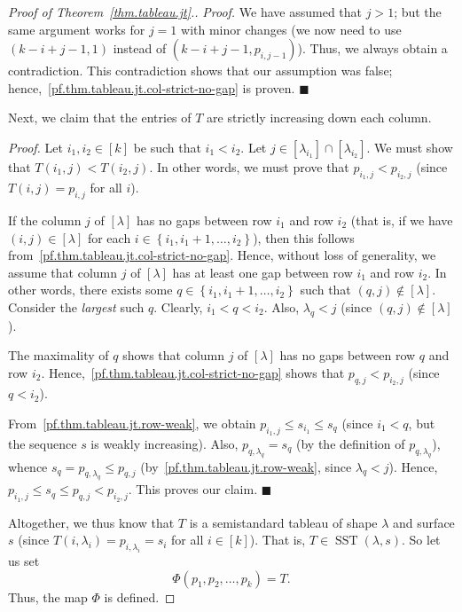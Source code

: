 \documentclass[reqno]{amsart}
\newcommand{\0}{\phantom{c}}
\newcommand{\diag}[1]{\left[#1\right]} %
\DeclareMathOperator{\SST}{SST} %
\newenvironment{subproof}{\textit{Proof.} }{\hfill$\blacksquare$ \medskip}
\newenvironment{verlong}{}{}
\newcommand{\set}[1]{\left\{ #1 \right\}}
\newcommand{\tup}[1]{\left( #1 \right)}
\newcommand{\ive}[1]{\left[ #1 \right]}
\theoremstyle{plain}
\theoremstyle{definition}
\numberwithin{equation}{section}
\begin{document}
\begin{verlong}
\begin{proof}[Proof of Theorem~\ref{thm.tableau.jt}.]
\begin{subproof}
We have assumed that $j > 1$; but the same argument works for $j = 1$ with minor 
changes
(we now need to use $\tup{k-i+j-1, 1}$ instead of $\tup{k-i+j-1, p_{i,j-1}}$).
Thus, we always obtain a contradiction.
This contradiction shows that our assumption was false; hence,~\eqref{pf.thm.tableau.jt.col-strict-no-gap} is proven.
\end{subproof}

Next, we claim that the entries of $T$ are strictly increasing down each column.

\begin{subproof}
Let $i_1,i_2\in\ive{k}$ be such that $i_1 < i_2$.
Let $j \in \ive{\lambda_{i_1}} \cap \ive{\lambda_{i_2}}$.
We must show that $T( i_1,j) < T(i_2, j)$.
In other words, we must prove that $p_{i_1,j} < p_{i_2,j}$ (since $T(i,j) = p_{i,j}$ for all $i$).

If the column $j$ of $\diag{\lambda}$ has no gaps between row $i_1$ and row $i_2$ (that is, if we have $(i,j) \in \diag{\lambda}$ for each $i \in \set{i_1, i_1+1, \dotsc, i_2}$), then this follows from~\eqref{pf.thm.tableau.jt.col-strict-no-gap}.
Hence, without loss of generality, we assume that column $j$ of $\diag{\lambda}$ has at least one gap between row $i_1$ and row $i_2$.
In other words, there exists some $q \in \set{i_1, i_1+1, \dotsc, i_2}$ such that $(q,j) \notin \diag{\lambda}$.
Consider the \emph{largest} such $q$.
Clearly, $i_1 < q < i_2$.
Also, $\lambda_{q} < j$ (since $(q,j) \notin \diag{\lambda}$).

The maximality of $q$ shows that column $j$ of $[\lambda]$ has no gaps between row $q$ and row $i_2$.
Hence,~\eqref{pf.thm.tableau.jt.col-strict-no-gap} shows that $p_{q,j}<p_{i_2,j}$ (since $q<i_2$).

From~\eqref{pf.thm.tableau.jt.row-weak}, we obtain $p_{i_1,j} \leq s_{i_1} \leq s_{q}$ (since $i_1 < q$, but the sequence $s$ is weakly increasing).
Also, $p_{q,\lambda_{q}} = s_{q}$ (by the definition of $p_{q,\lambda_{q}}$), whence $s_{q} = p_{q,\lambda_{q}} \leq p_{q,j}$ (by~\eqref{pf.thm.tableau.jt.row-weak}, since $\lambda_{q} < j$).
Hence, $p_{i_1,j} \leq s_{q} \leq p_{q,j} < p_{i_2,j}$. This proves our claim.
\end{subproof}

Altogether, we thus know that $T$ is a semistandard tableau of shape $\lambda$ and surface $s$ (since $T(i, \lambda_i) = p_{i,\lambda_i} = s_i$ for all $i \in \ive{k}$).
That is, $T \in \SST(\lambda, s)$.
So let us set
\[
\Phi(p_1, p_2, \dotsc, p_k) = T.
\]
Thus, the map $\Phi$ is defined.


\end{proof}
\end{verlong}
\end{document}
